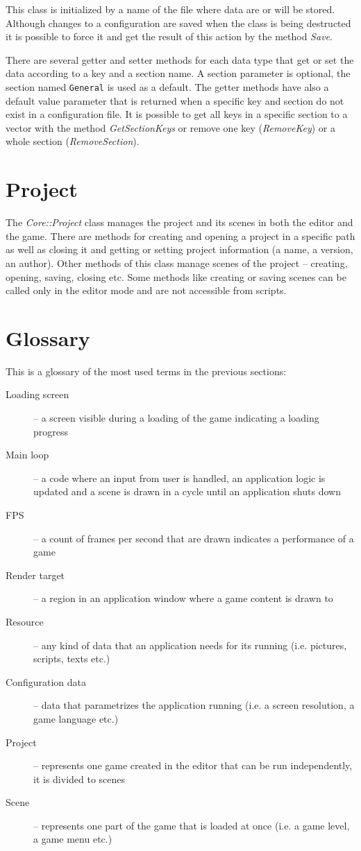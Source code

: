 \documentclass[a4paper, 12pt]{report}
\begin{document}
This class is initialized by a name of the file where data are or will be stored. Although changes to a configuration are saved when the class is being destructed it is possible to force it and get the result of this action by the method \emph{Save}.

There are several getter and setter methods for each data type that get or set the data according to a key and a section name. A section parameter is optional, the section named \verb|General| is used as a default. The getter methods have also a default value parameter that is returned when a specific key and section do not exist in a configuration file. It is possible to get all keys in a specific section to a vector with the method \emph{GetSectionKeys} or remove one key (\emph{RemoveKey}) or a whole section (\emph{RemoveSection}).

\section{Project}

The \emph{Core::Project} class manages the project and its scenes in both the editor and the game. There are methods for creating and opening a project in a specific path as well as closing it and getting or setting project information (a name, a version, an author). Other methods of this class manage scenes of the project -- creating, opening, saving, closing etc. Some methods like creating or saving scenes can be called only in the editor mode and are not accessible from scripts.

\section{Glossary}
This is a glossary of the most used terms in the previous sections:

\begin{description}
  \item[Loading screen] -- a screen visible during a loading of the game indicating a loading progress
  \item[Main loop] -- a code where an input from user is handled, an application logic is updated and a scene is drawn in a cycle until an application shuts down
  \item[FPS] -- a count of frames per second that are drawn indicates a performance of a game
  \item[Render target] -- a region in an application window where a game content is drawn to
  \item[Resource] -- any kind of data that an application needs for its running (i.e. pictures, scripts, texts etc.)
  \item[Configuration data] -- data that parametrizes the application running (i.e. a screen resolution, a game language etc.)
  \item[Project] -- represents one game created in the editor that can be run independently, it is divided to scenes
  \item[Scene] -- represents one part of the game that is loaded at once (i.e. a game level, a game menu etc.)
\end{description}
\end{document}
